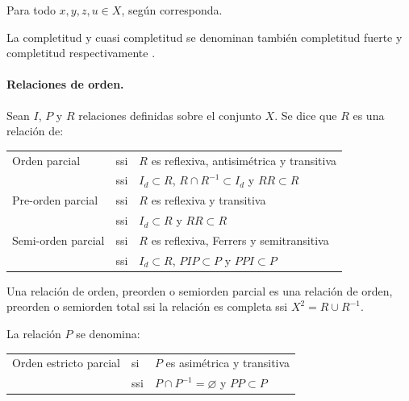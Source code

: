 \documentclass[a5paper,doc,10pt,noapacite]{apa6}
\begin{document}
{{Para todo \(x,y,z,u \in X\), según corresponda.

La completitud y cuasi completitud se denominan también completitud fuerte y completitud
respectivamente .


\paragraph{Relaciones de orden.}

Sean \(I\), \(P\) y \(R\) relaciones definidas sobre el conjunto \(X\). Se dice que \(R\) es una relación de:

\begin{table}[H]
\fontsize{8}{11}\selectfont
\begin{center}
\begin{tabular}{l l l }
	Orden parcial      & ssi & \(R\) es reflexiva, antisimétrica y transitiva  \\
	                   & ssi & \(I_d \subset R\), \( R \cap R^{-1} \subset I_d \) y \(RR \subset R \)\\
    Pre-orden parcial  & ssi & \(R\) es reflexiva y transitiva \\
                       & ssi & \(I_d \subset R\) y \(RR \subset R \)\\
    Semi-orden parcial & ssi & \(R\) es reflexiva, Ferrers y semitransitiva \\
                       & ssi & \(I_d \subset R\), \(PIP \subset P\) y \(PPI \subset P \)\\[-1\baselineskip]
\end{tabular}
\label{tab:B8} 
\end{center}
\end{table}

\vspace{-1\baselineskip}

Una relación de orden, preorden o semiorden parcial es una relación de orden, preorden o semiorden total ssi la relación es completa ssi \(X^2 = R \cup R^{-1}\).

La relación \(P\) se denomina:

\begin{table}[H]
\fontsize{7.5}{11}\selectfont
\begin{center}
	\begin{tabular}{l l l }
		Orden estricto parcial & si & \(P\) es asimétrica y transitiva \\
	    	                   & ssi & \(P \cap P^{-1} = \varnothing \) y \(PP \subset P \)\\[-1\baselineskip]
	\end{tabular}
	\label{tab:B9} 
\end{center}
\end{table}

}}
\end{document}
